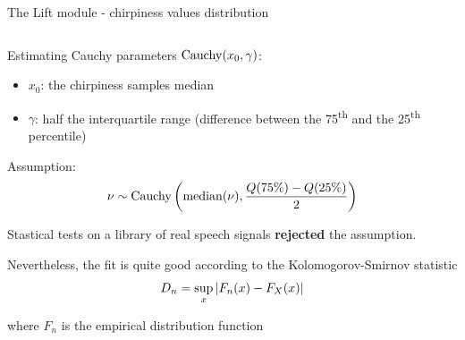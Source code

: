 \documentclass[10pt,american,ignorenonframetext,aspectratio=1610]{beamer}
\providecommand{\tightlist}{%
  \setlength{\itemsep}{0pt}\setlength{\parskip}{0pt}}
\theoremstyle{remark}
\begin{document}
\begin{frame}{The Lift module - chirpiness values distribution}
\protect\hypertarget{the-lift-module---chirpiness-values-distribution-1}{}

\begin{columns}[T]
\begin{column}{0.5\textwidth}
Estimating Cauchy parameters \(\mathrm{Cauchy}(x_0, \gamma)\):

\begin{itemize}
\tightlist
\item
  \(x_0\): the chirpiness samples median
\item
  \(\gamma\): half the interquartile range (difference between the
  75\textsuperscript{th} and the 25\textsuperscript{th} percentile)
\end{itemize}

Assumption: \[\nu\sim\mathrm{Cauchy}\left(\mathrm{median}(\nu),\frac{Q(75\%)-Q(25\%)}{2}\right)\]

Stastical tests on a library of real speech signals \textbf{rejected}
the assumption.

Nevertheless, the fit is quite good according to the Kolomogorov-Smirnov
statistic \[D_n=\sup_x\left\lvert F_n(x)-F_X(x)\right\rvert\]

where \(F_n\) is the empirical distribution function
\end{column}


\end{columns}
\end{frame}
\end{document}
